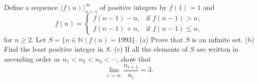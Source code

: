Define a sequence $\langle f(n)\rangle_{n=1}^{\infty}$ of positive integers by $f(1)=1$ and
\[
f(n)=\begin{cases} f(n-1)-n, & \text{if } f(n-1)>n; \\ f(n-1)+n, & \text{if } f(n-1)\leq n, \end{cases}
\]
for $n\geq 2$. Let $S=\{n\in\mathbb{N}\mid f(n)=1993\}$.
(a) Prove that $S$ is an infinite set.
(b) Find the least positive integer in $S$.
(c) If all the elements of $S$ are written in ascending order as $n_1<n_2<n_3<\cdots$, show that
\[
\lim_{i\to\infty}\frac{n_{i+1}}{n_i}=3.
\]
